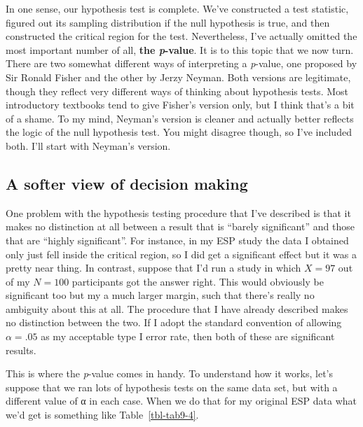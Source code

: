 \documentclass[
  a4paper,
]{book}
\begin{document}
In one sense, our hypothesis test is complete. We've constructed a test
statistic, figured out its sampling distribution if the null hypothesis
is true, and then constructed the critical region for the test.
Nevertheless, I've actually omitted the most important number of all,
\textbf{the \emph{p}-value}. It is to this topic that we now turn. There
are two somewhat different ways of interpreting a \emph{p}-value, one
proposed by Sir Ronald Fisher and the other by Jerzy Neyman. Both
versions are legitimate, though they reflect very different ways of
thinking about hypothesis tests. Most introductory textbooks tend to
give Fisher's version only, but I think that's a bit of a shame. To my
mind, Neyman's version is cleaner and actually better reflects the logic
of the null hypothesis test. You might disagree though, so I've included
both. I'll start with Neyman's version.

\hypertarget{a-softer-view-of-decision-making}{%
\subsection{A softer view of decision
making}\label{a-softer-view-of-decision-making}}

One problem with the hypothesis testing procedure that I've described is
that it makes no distinction at all between a result that is ``barely
significant'' and those that are ``highly significant''. For instance,
in my ESP study the data I obtained only just fell inside the critical
region, so I did get a significant effect but it was a pretty near
thing. In contrast, suppose that I'd run a study in which \(X = 97\) out
of my \(N = 100\) participants got the answer right. This would
obviously be significant too but my a much larger margin, such that
there's really no ambiguity about this at all. The procedure that I have
already described makes no distinction between the two. If I adopt the
standard convention of allowing \(\alpha = .05\) as my acceptable type I
error rate, then both of these are significant results.

This is where the \emph{p}-value comes in handy. To understand how it
works, let's suppose that we ran lots of hypothesis tests on the same
data set, but with a different value of α in each case. When we do that
for my original ESP data what we'd get is something like
Table~\ref{tbl-tab9-4}.

\hypertarget{tbl-tab9-4}{}
 
  \providecommand{\huxb}[2]{\arrayrulecolor[RGB]{#1}\global\arrayrulewidth=#2pt}
  \providecommand{\huxvb}[2]{\color[RGB]{#1}\vrule width #2pt}
  \providecommand{\huxtpad}[1]{\rule{0pt}{#1}}
  \providecommand{\huxbpad}[1]{\rule[-#1]{0pt}{#1}}
\end{document}
